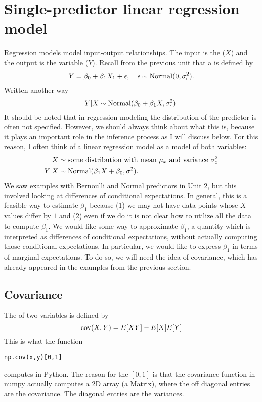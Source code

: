 \section{Single-predictor linear regression model}
Regression models model input-output relationships. The input is the  ($X$) and the output is the  variable ($Y$). Recall from the previous unit that a   is defined by
\begin{align*}
Y = \beta_0 + \beta_1 X_1 + \epsilon,\quad \epsilon \sim {\rm Normal}(0,\sigma_{\epsilon}^2).
\end{align*}
Written another way
\begin{equation}
Y|X \sim {\rm Normal}(\beta_0 + \beta_1 X,\sigma_{\epsilon}^2). 
\end{equation}
It should be noted that in regression modeling the distribution of the predictor is often not specified. However, we should always think about what this is, because it plays an important role in the inference process as I will discuss below. For this reason, I often think of a linear regression model as a model of both variables:
\begin{align}
\begin{split}\label{eq:linreg}
X &\sim \text{some distribution with mean $\mu_x$ and variance $\sigma_x^2$}\\
Y|X &\sim {\rm Normal}(\beta_1X + \beta_0,\sigma^2). 
\end{split}
\end{align}
We saw examples with Bernoulli and Normal predictors in Unit 2, but this involved looking at differences of conditional expectations. In general, this is a feasible way to estimate $\beta_1$ because (1) we may not have data points whose $X$ values differ by $1$ and (2) even if we do it is not clear how to utilize all the data to compute $\beta_1$. We would like some way to approximate $\beta_1$, a quantity which is interpreted as differences of conditional expectations, without actually computing those conditional expectations. In particular, we would like to express $\beta_1$ in terms of marginal expectations. To do so, we will need the idea of covariance, which has already appeared in the examples from the previous section. 



\subsection{Covariance} 
The  of two variables is defined by
\begin{equation}
{\rm cov}(X,Y) = E[XY]-E[X]E[Y]
\end{equation}
This is what the function 
\begin{Verbatim}
np.cov(x,y)[0,1]
\end{Verbatim}
computes in Python. 
The reason for the $[0,1]$ is that the covariance function in numpy actually computes a 2D array (a Matrix), where the off diagonal entries are the covariance. The diagonal entries are the variances. 

